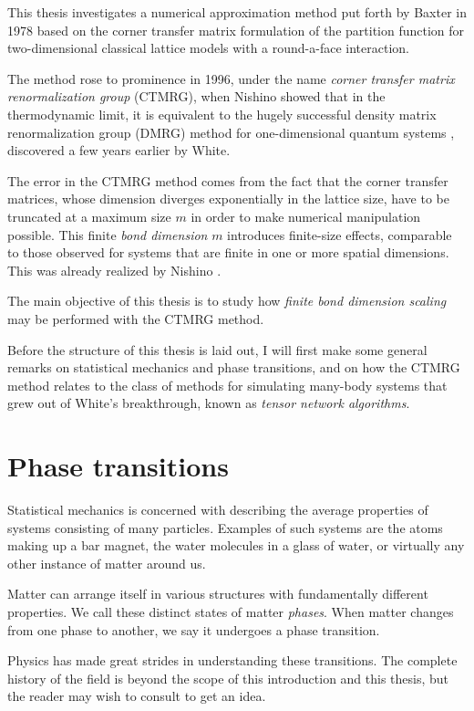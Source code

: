 This thesis investigates a numerical approximation method put forth by
Baxter in 1978 \cite{baxter1978variational, baxter1982exactly_ctm,
tsang1979square} based on the corner transfer matrix formulation of the
partition function for two-dimensional classical lattice models with
a round-a-face interaction. 

The method rose to prominence in 1996, under the name \emph{corner
transfer matrix renormalization group} (CTMRG), when Nishino showed
\cite{nishino1996corner} that in the thermodynamic limit, it is equivalent
to the hugely successful density matrix renormalization group (DMRG)
method for one-dimensional quantum systems \cite{white1992density},
discovered a few years earlier by White.

The error in the CTMRG method comes from the fact that the corner transfer
matrices, whose dimension diverges exponentially in the lattice size, have
to be truncated at a maximum size $m$ in order to make numerical
manipulation possible. This finite \emph{bond dimension} $m$ introduces
finite-size effects, comparable to those observed for systems that are
finite in one or more spatial dimensions. This was already realized by
Nishino \cite{nishino1996numerical}.

The main objective of this thesis is to study how \emph{finite bond
dimension scaling} may be performed with the CTMRG method.

Before the structure of this thesis is laid out, I will first make some
general remarks on statistical mechanics and phase transitions, and on how
the CTMRG method relates to the class of methods for simulating many-body
systems that grew out of White's breakthrough, known as \emph{tensor
network algorithms}.

\section{Phase transitions}
Statistical mechanics is concerned with describing the average properties
of systems consisting of many particles. Examples of such systems are the
atoms making up a bar magnet, the water molecules in a glass of water, or
virtually any other instance of matter around us.

Matter can arrange itself in various structures with fundamentally
different properties. We call these distinct states of matter
\emph{phases}. When matter changes from one phase to another, we say it
undergoes a phase transition.

Physics has made great strides in understanding these transitions. The
complete history of the field is beyond the scope of this introduction and this
thesis, but the reader may wish to consult \cite{kadanoff2009more,
domb1996critical} to get an idea.

